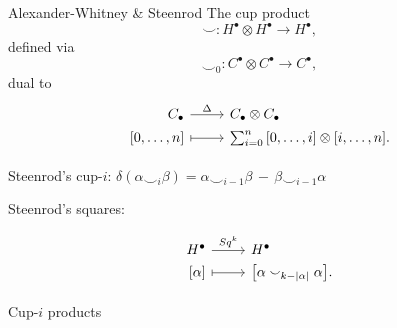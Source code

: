 {\begin{frame}{Alexander-Whitney \& Steenrod}
		\vskip -5pt
		The cup product
		\begin{equation*}
			\smallsmile \colon H^\bullet \otimes H^\bullet \to H^\bullet,
		\end{equation*}
		\vskip -9pt
		defined via
		\vskip -9pt
		\begin{equation*}
			\smallsmile_0 \colon C^\bullet \otimes C^\bullet \to C^\bullet,
		\end{equation*}
		dual to
		\begin{equation*}
			\begin{tikzcd}[
				,row sep = 0ex
				,/tikz/column 1/.append style={anchor=base east}
				,/tikz/column 2/.append style={anchor=base west}
				]
				C_\bullet \arrow[r, "\Delta"] & C_\bullet \otimes C_\bullet \\
				{[0, \dots, n]} \arrow[r, |->] & \sum_{i=0}^{n} {[0, \dots, i] \otimes [i, \dots, n]}.
			\end{tikzcd}
		\end{equation*}

		\vskip 15pt

		\textcolor{pblue}{Steenrod's cup-$i$:} \quad
		$\delta(\alpha \smallsmile_i \beta) = \alpha \smallsmile_{i-1} \beta\, -\, \beta \smallsmile_{i-1} \alpha$

		\vskip 15pt
		\pause

		\textcolor{pblue}{Steenrod's squares:}

		\vskip -15pt
		\begin{equation*}
			\begin{tikzcd}[
				,row sep = 0ex
				,/tikz/column 1/.append style={anchor=base east}
				,/tikz/column 2/.append style={anchor=base west}
				]
				H^\bullet \arrow[r, "Sq^k"] & H^\bullet \\
				{[\alpha]} \arrow[r, |->] & {\left[\alpha \smallsmile_{k-|\alpha|} \alpha\right]}.
			\end{tikzcd}
		\end{equation*}
	\end{frame}

	\begin{frame}[c]{Cup-$i$ products}

\end{frame}}
